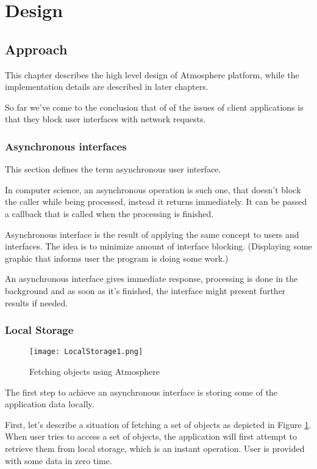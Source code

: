 \section{Design}

\subsection{Approach}

This chapter describes the high level design of Atmosphere platform, while the implementation details are described in later chapters. 

So far we’ve come to the conclusion that of of the issues of client applications is that they block user interfaces with network requests.

\subsubsection{Asynchronous interfaces}

This section defines the term asynchronous user interface. \citep{maccaw_async}

In computer science, an asynchronous operation is such one, that doesn’t block the caller while being processed, instead it returns immediately. It can be passed a callback that is called when the processing is finished.

Asynchronous interface is the result of applying the same concept to users and interfaces. The idea is to minimize amount of interface blocking. (Displaying some graphic that informs user the program is doing some work.)

An asynchronous interface gives immediate response, processing is done in the background and as soon as it's finished, the interface might present further results if needed.

\subsubsection{Local Storage}

\begin{figure}[ht!]
\centering
\texttt{[image: LocalStorage1.png]}
\caption{Fetching objects using Atmosphere \label{fig:1}}
\end{figure}

The first step to achieve an asynchronous interface is storing some of the application data locally.

First, let's describe a situation of fetching a set of objects as depicted in Figure \ref{fig:1}. When user tries to access a set of objects,  the application will first attempt to retrieve them from local storage,  which is an instant operation. User is provided with some data in zero time.

